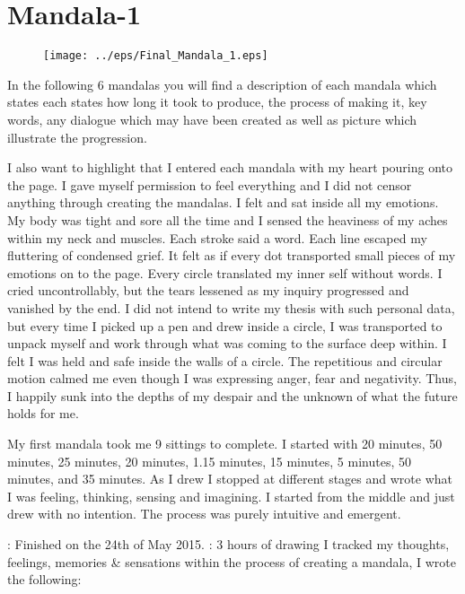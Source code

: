 \chapter{Mandala-1}

\begin{figure}[htbp]
\begin{center}
\texttt{[image: ../eps/Final\_Mandala\_1.eps]}
\label{label}
\end{center}
\end{figure}

\newpage
In the following 6 mandalas you will find a description of each mandala which states each states how long it took to produce, the process of making it, key words, any dialogue which may have been created as well as picture which illustrate the progression. 

I also want to highlight that I entered each mandala with my heart pouring onto the page. I gave myself permission to feel everything and I did not censor anything through creating the mandalas. I felt and sat inside all my emotions. My body was tight and sore all the time and I sensed the heaviness of my aches within my neck and muscles. Each stroke said a word. Each line escaped my fluttering of condensed grief. It felt as if every dot transported small pieces of my emotions on to the page. Every circle translated my inner self without words. I cried uncontrollably, but the tears lessened as my inquiry progressed and vanished by the end. I did not intend to write my thesis with such personal data, but every time I picked up a pen and drew inside a circle, I was transported to unpack myself and work through what was coming to the surface deep within. I felt I was held and safe inside the walls of a circle. The repetitious and circular motion calmed me even though I was expressing anger, fear and negativity. Thus, I happily sunk into the depths of my despair and the unknown of what the future holds for me. 

My first mandala took me 9 sittings to complete. I started with 20 minutes, 50 minutes, 25 minutes, 20 minutes, 1.15 minutes, 15 minutes, 5 minutes, 50 minutes, and 35 minutes. As I drew I stopped at different stages and wrote what I was feeling, thinking, sensing and imagining. I started from the middle and just drew with no intention. The process was purely intuitive and emergent. 

\Date: Finished on the 24th of May 2015.
\Total: 3 hours of drawing
I tracked my thoughts, feelings, memories & sensations within the process of creating a mandala, I wrote the following:



